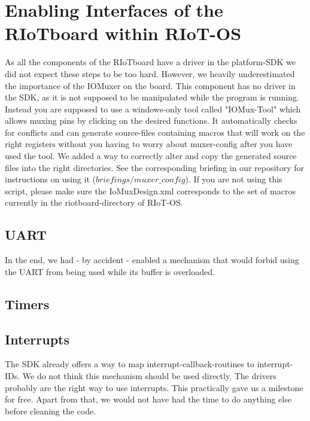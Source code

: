 \section{Enabling Interfaces of the RIoTboard within RIoT-OS}

As all the components of the RIoTboard have a driver in the platform-SDK we did not
expect these steps to be too hard. However, we heavily underestimated the importance of
the IOMuxer on the board. This component has no driver in the SDK, as it is not supposed
to be manipulated while the program is running. Instead you are supposed to use a
windows-only tool called "IOMux-Tool" which allows muxing pins by clicking on the desired
functions.
It automatically checks for conflicts and can generate source-files containing macros
that will work on the right registers without you having to worry about muxer-config
after you have used the tool.
We added a way to correctly alter and copy the generated source files into the right
directories. See the corresponding briefing in our repository for instructions on using
it (\textit{$briefings/muxer\_config$}).
If you are not using this script, please make sure the IoMuxDesign.xml corresponds
to the set of macros currently in the riotboard-directory of RIoT-OS.

\subsection{UART}

In the end, we had - by accident - enabled a mechanism that would forbid using the UART
from being used while its buffer is overloaded.

\subsection{Timers}

\subsection{Interrupts}

The SDK already offers a way to map interrupt-callback-routines to interrupt-IDs.
We do not think this mechanism should be used directly. The drivers probably are the
right way to use interrupts.
This practically gave us a milestone for free. Apart from that, we would not have had the
time to do anything else before cleaning the code.
